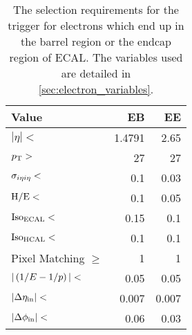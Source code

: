 \begin{table}[h]
    \centering
    \begin{center}
        \begin{tabular}{@{}l r r@{}}
            \toprule
            Value                      & EB     & EE     \\
            \midrule
            $|\eta| <$                 & 1.4791 & 2.65   \\
            $p_{\mathrm{T}} >$                    & 27     & 27     \\
            $\sigma_{i \eta i \eta} <$         & 0.1    & 0.03   \\
            $\text{H}/\text{E} <$                & 0.1    & 0.05   \\
            $\text{Iso}_{\text{ECAL}} <$               & 0.15   & 0.1    \\
            $\text{Iso}_{\text{HCAL}} <$               & 0.1    & 0.1    \\
            Pixel Matching $\ge$       & 1      & 1      \\
            $|\left( 1/E - 1/p \right)| <$              & 0.05   & 0.05   \\
            $|\Delta \eta_{\text{in}}| <$              & 0.007  & 0.007  \\
            $|\Delta \phi_{\text{in}}| <$              & 0.06   & 0.03   \\
            \bottomrule
        \end{tabular}
    \end{center}
    \caption[
        The selection requirements for the \SingleElectronTrigger trigger.
    ]{
        The selection requirements for the \SingleElectronTrigger trigger for
        electrons which end up in the barrel region or the endcap region of ECAL.
        The variables used are detailed in \cref{sec:electron_variables}.
    }
    \label{table:wp80}
\end{table}
